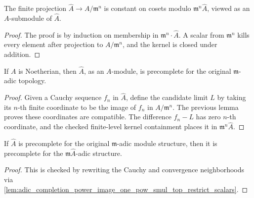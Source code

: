 \begin{lemma}
  \label{lem:adic_completion_eval_eq_of_smod_eq}
  The finite projection
  \(\widehat A\to A/\mathfrak m^n\) is constant on cosets modulo
  \(\mathfrak m^n\widehat A\), viewed as an \(A\)-submodule of
  \(\widehat A\).
\end{lemma}

\begin{proof}
  The proof is by induction on membership in
  \(\mathfrak m^n\cdot\widehat A\).  A scalar from \(\mathfrak m^n\) kills
  every element after projection to \(A/\mathfrak m^n\), and the kernel is
  closed under addition.
\end{proof}

\begin{lemma}
  \label{lem:adic_completion_is_precomplete_original_source}
  If \(A\) is Noetherian, then \(\widehat A\), as an \(A\)-module, is
  precomplete for the original \(\mathfrak m\)-adic topology.
\end{lemma}

\begin{proof}
  Given a Cauchy sequence \(f_n\) in \(\widehat A\), define the candidate
  limit \(L\) by taking its \(n\)-th finite coordinate to be the image of
  \(f_n\) in \(A/\mathfrak m^n\).  The previous lemma proves these coordinates
  are compatible.  The difference \(f_n-L\) has zero \(n\)-th coordinate, and
  the checked finite-level kernel containment places it in
  \(\mathfrak m^n\widehat A\).
\end{proof}

\begin{lemma}
  \label{lem:adic_completion_power_image_one_is_precomplete_of_original_precomplete}
  If \(\widehat A\) is precomplete for the original \(\mathfrak m\)-adic
  module structure, then it is precomplete for the
  \(\mathfrak m\widehat A\)-adic structure.
\end{lemma}

\begin{proof}
  This is checked by rewriting the Cauchy and convergence neighborhoods via
  \cref{lem:adic_completion_power_image_one_pow_smul_top_restrict_scalars}.
\end{proof}

